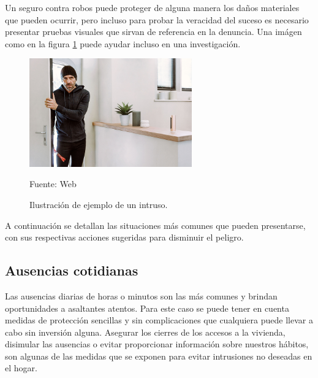 Un seguro contra robos puede proteger de alguna manera los daños materiales que pueden ocurrir, pero incluso para probar la veracidad del suceso es necesario presentar pruebas visuales que sirvan de referencia en la denuncia. Una imágen como en la figura \ref{fig:intruso} puede ayudar incluso en una investigación.\\

\begin{figure}[H]
    \begin{center}
        \includegraphics[width=7cm]{img/capitulo_3/intruso.jpg}
    \end{center}
    \begin{center}
        \caption{Ilustración de ejemplo de un intruso.}
        Fuente: Web
        \label{fig:intruso}
    \end{center}
\end{figure}

A continuación se detallan las situaciones más comunes que pueden presentarse, con sus respectivas acciones sugeridas para disminuir el peligro.\\

\subsection{Ausencias cotidianas}
Las ausencias diarias de horas o minutos son las más comunes y brindan oportunidades a asaltantes atentos. Para este caso se puede tener en cuenta medidas de protección sencillas y sin complicaciones que cualquiera puede llevar a cabo sin inversión alguna. Asegurar los cierres de los accesos a la vivienda, disimular las ausencias o evitar proporcionar información sobre nuestros hábitos, son algunas de las medidas que se exponen para evitar intrusiones no deseadas en el hogar.\\
 

